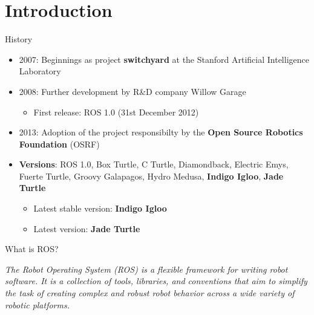 \documentclass{beamer}
\begin{document}
\section{Introduction}
\begin{frame}{History}
\begin{itemize}
 \item 2007: Beginnings as project \textbf{switchyard} at the Stanford Artificial Intelligence Laboratory
 \item 2008: Further development by R\&D company Willow Garage  \href{https://www.willowgarage.com/pages/pr2/overview}{}
 \begin{itemize}
  \item First release: ROS 1.0 (31st December 2012)
 \end{itemize}
 \item 2013: Adoption of the project responsibilty by the \textbf{Open Source Robotics Foundation} (OSRF)
\end{itemize}

\begin{itemize}
 \item \textbf{Versions}: ROS 1.0, Box Turtle, C Turtle, Diamondback, Electric Emys, Fuerte Turtle, Groovy Galapagos, Hydro Medusa, \textbf{Indigo Igloo}, \textbf{Jade Turtle}
 \begin{itemize}
  \item Latest stable version: \textbf{Indigo Igloo}
  \item Latest version: \textbf{Jade Turtle}
 \end{itemize}
\end{itemize}
\end{frame}
\begin{frame}{What is ROS?}
\begin{definition}[ROS]
\textit{The Robot Operating System (ROS) is a flexible framework for writing robot software. It is a collection of tools, libraries, and conventions that aim to simplify the task of creating complex and robust robot behavior across a wide variety of robotic platforms.}
\end{definition}
\end{frame}
\end{document}
